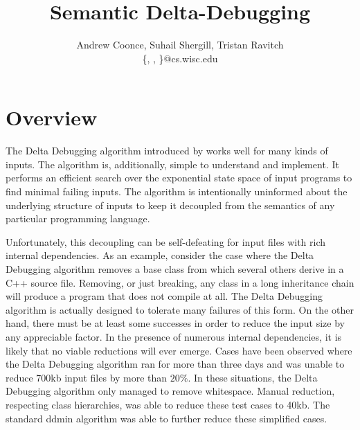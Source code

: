 \documentclass[11pt]{article}
\title{Semantic Delta-Debugging}
\author{Andrew Coonce, Suhail Shergill, Tristan Ravitch \\
\{\mailto{coonce}, \mailto{shergill}, \mailto{travitch}\}@cs.wisc.edu
}
\begin{document}
\maketitle

\section{Overview}
\label{sec:intro}
The Delta Debugging algorithm introduced by \citet{dd} works well
for many kinds of inputs. The algorithm is, additionally, simple to understand
and implement. It performs an efficient search over the exponential state space
of input programs to find minimal failing inputs. The algorithm is intentionally
uninformed about the underlying structure of inputs to keep it decoupled from
the semantics of any particular programming language.

Unfortunately, this decoupling can be self-defeating for input files with rich
internal dependencies. As an example, consider the case where the Delta
Debugging algorithm removes a base class from which several others derive in a
C++ source file. Removing, or just breaking, any class in a long inheritance
chain will produce a program that does not compile at all. The Delta Debugging
algorithm is actually designed to tolerate many failures of this form. On the
other hand, there must be at least some successes in order to reduce the input
size by any appreciable factor. In the presence of numerous internal
dependencies, it is likely that no viable reductions will ever emerge. Cases
have been observed \citep{trex} where the Delta Debugging algorithm ran for more
than three days and was unable to reduce 700kb input files by more than $20
\%$. In these situations, the Delta Debugging algorithm only managed to remove
whitespace.  Manual reduction, respecting class hierarchies, was able to reduce
these test cases to 40kb.  The standard ddmin algorithm was able to further
reduce these simplified cases.
\end{document}
